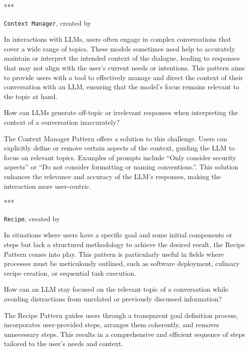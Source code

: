 \begin{center}
***
\end{center}

\texttt{Context Manager}, created by \textcite{white2023prompt}

 In interactions with LLMs, users often engage in complex conversations that cover a wide range of topics. These models sometimes need help to accurately maintain or interpret the intended context of the dialogue, leading to responses that may not align with the user's current needs or intentions. This pattern aims to provide users with a tool to effectively manage and direct the context of their conversation with an LLM, ensuring that the model's focus remains relevant to the topic at hand.

How can LLMs generate off-topic or irrelevant responses when interpreting the context of a conversation inaccurately?

 The Context Manager Pattern offers a solution to this challenge. Users can explicitly define or remove certain aspects of the context, guiding the LLM to focus on relevant topics. Examples of prompts include ``Only consider security aspects'' or ``Do not consider formatting or naming conventions.''. This solution enhances the relevance and accuracy of the LLM's responses, making the interaction more user-centric.

\begin{center}
***
\end{center}

\texttt{Recipe}, created by \textcite{white2023prompt}

 In situations where users have a specific goal and some initial components or steps but lack a structured methodology to achieve the desired result, the Recipe Pattern comes into play. This pattern is particularly useful in fields where processes must be meticulously outlined, such as software deployment, culinary recipe creation, or sequential task execution.

 How can an LLM stay focused on the relevant topic of a conversation while avoiding distractions from unrelated or previously discussed information?

 The Recipe Pattern guides users through a transparent goal definition process, incorporates user-provided steps, arranges them coherently, and removes unnecessary steps. This results in a comprehensive and efficient sequence of steps tailored to the user's needs and context.

